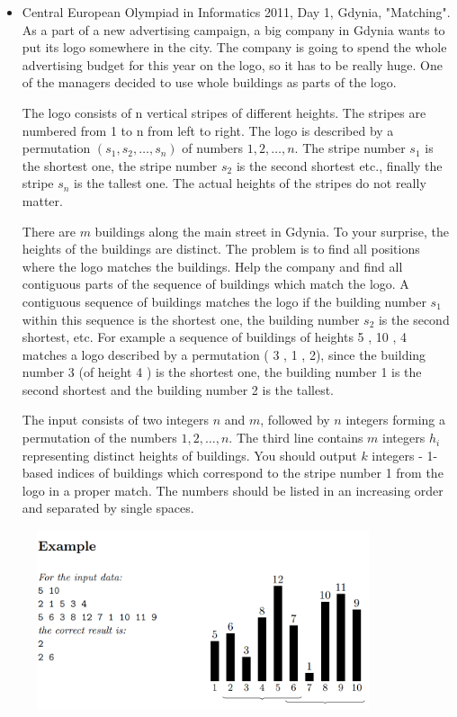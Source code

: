 \documentclass[letterpaper]{article}
\begin{document}
\begin{itemize}
    \item Central European Olympiad in Informatics 2011, Day 1, Gdynia, "Matching".
    As a part of a new advertising campaign, a big company in Gdynia wants to
put its logo somewhere in the city. The company is going to spend the whole
advertising budget for this year on the logo, so it has to be really huge. One
of the managers decided to use whole buildings as parts of the logo.

The logo consists of n vertical stripes of different heights. The stripes are
numbered from 1 to n from left to right. The logo is described by a permutation $(s_{1},s_{2},\dots,s_{n})$ of numbers $1,2,\dots,n$. The stripe number $s_{1}$ is the shortest one, the stripe number $s_{2}$ is the second shortest etc., finally the stripe $s_{n}$ is the tallest one. The actual heights of the stripes do not really matter.

There are $m$ buildings along the main street in Gdynia. To your surprise,
the heights of the buildings are distinct. The problem is to find all positions
where the logo matches the buildings.
Help the company and find all contiguous parts of the sequence of buildings
which match the logo. A contiguous sequence of buildings matches the logo if
the building number $s_{1}$ within this sequence is the shortest one, the building
number $s_{2}$ is the second shortest, etc. For example a sequence of buildings of
heights 5 , 10 , 4 matches a logo described by a permutation ( 3 , 1 , 2), since the
building number 3 (of height 4 ) is the shortest one, the building number 1 is
the second shortest and the building number 2 is the tallest.

The input consists of two integers $n$ and $m$, followed by $n$ integers forming a permutation of the numbers $1,2,\dots,n$. The third line contains $m$ integers $h_{i}$ representing distinct heights of buildings. You should output $k$ integers - 1-based indices of buildings which correspond to the stripe number 1 from the logo in a proper match. The numbers should be listed in an increasing order and separated by single spaces.
\end{itemize}


\begin{figure} [h!]
\centering
\includegraphics[width=0.87\textwidth]{Problems/GdyiniaMatchingExampleInputOutput.png}
\end{figure}
\end{document}
